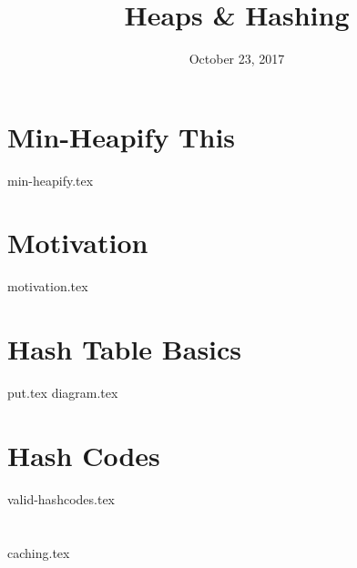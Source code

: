 \documentclass[11pt]{exam}
\title{Heaps \& Hashing}
\date{October 23, 2017}
\begin{document}
\maketitle

\section{Min-Heapify This}
\begin{questions}
{min-heapify.tex}
\end{questions}

\section{Motivation}
\begin{questions}
{motivation.tex}
\end{questions}

\section{Hash Table Basics}
\begin{questions}
{put.tex}
{diagram.tex}
\end{questions}

\section{Hash Codes}
\begin{questions}
{valid-hashcodes.tex}
\end{questions}

\section{}
\begin{questions}
{caching.tex}
\end{questions}
\end{document}

